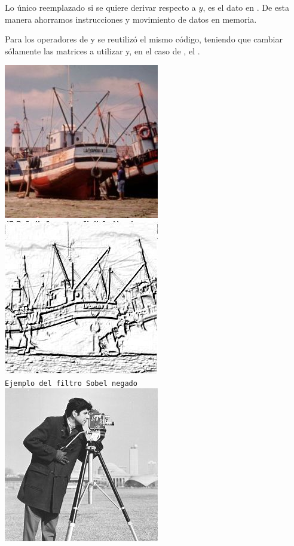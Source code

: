 \noindent Lo \'unico reemplazado si se quiere derivar respecto a $y$, es el dato en . De esta manera 
ahorramos instrucciones y movimiento de datos en memoria.

Para los operadores de  y  se reutiliz\'o el mismo c\'odigo, teniendo que 
cambiar s\'olamente las matrices a utilizar y, en el caso de , el .\\
\vspace{1.0cm}
\begin{center}
\includegraphics[scale=0.5]{imgs/BoatsColor.jpg}
\includegraphics[scale=0.5]{imgs/BoatsColor-sobel-neg.jpg}\\
\texttt{\small Ejemplo del filtro Sobel negado}\\
\vspace{1.0cm}
\includegraphics[scale=0.5]{imgs/cameraman.jpg}

\end{center}
